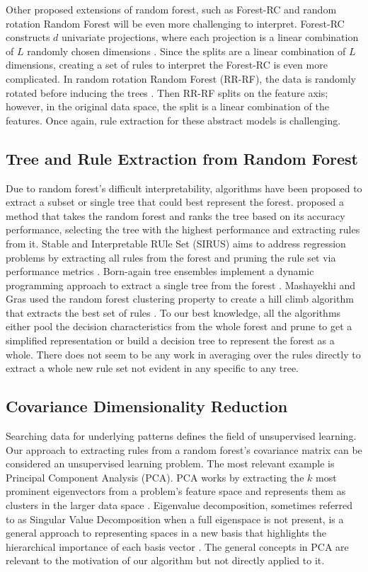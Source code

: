 \documentclass[11pt]{article}
\begin{document}
Other proposed extensions of random forest, such as Forest-RC and random rotation Random Forest will be even more challenging to interpret. Forest-RC constructs $d$ univariate projections, where each projection is a linear combination of $L$ randomly chosen dimensions \citep{breiman2001random}. Since the splits are a linear combination of $L$ dimensions, creating a set of rules to interpret the Forest-RC is even more complicated. In random rotation Random Forest (RR-RF), the data is randomly rotated before inducing the trees \citep{blaser2016random}. Then RR-RF splits on the feature axis; however, in the original data space, the split is a linear combination of the features. Once again, rule extraction for these abstract models is challenging. 

\subsection{Tree and Rule Extraction from Random Forest}
Due to random forest's difficult interpretability, algorithms have been proposed to extract a subset or single tree that could best represent the forest. \cite{boruah2022transparent} proposed a method that takes the random forest and ranks the tree based on its accuracy performance, selecting the tree with the highest performance and extracting rules from it. Stable and Interpretable RUle Set (SIRUS) aims to address regression problems by extracting all rules from the forest and pruning the rule set via performance metrics \citep{benard2021interpretable}. Born-again tree ensembles implement a dynamic programming approach to extract a single tree from the forest \citep{vidal2020born}. Mashayekhi and Gras used the random forest clustering property to create a hill climb algorithm that extracts the best set of rules \citep{mashayekhi2015rule}. To our best knowledge, all the algorithms either pool the decision characteristics from the whole forest and prune to get a simplified representation or build a decision tree to represent the forest as a whole. There does not seem to be any work in averaging over the rules directly to extract a whole new rule set not evident in any specific to any tree.
 
\subsection{Covariance Dimensionality Reduction}
Searching data for underlying patterns defines the field of unsupervised learning. Our approach to extracting rules from a random forest's covariance matrix can be considered an unsupervised learning problem. The most relevant example is Principal Component Analysis (PCA). PCA works by extracting the $k$ most prominent eigenvectors from a problem's feature space and represents them as clusters in the larger data space \citep{scholkopf1997kernel}. Eigenvalue decomposition, sometimes referred to as Singular Value Decomposition when a full eigenspace is not present, is a general approach to representing spaces in a new basis that highlights the hierarchical importance of each basis vector \citep{strang2006linear, griffiths2018introduction}. The general concepts in PCA are relevant to the motivation of our algorithm but not directly applied to it. 
\end{document}
